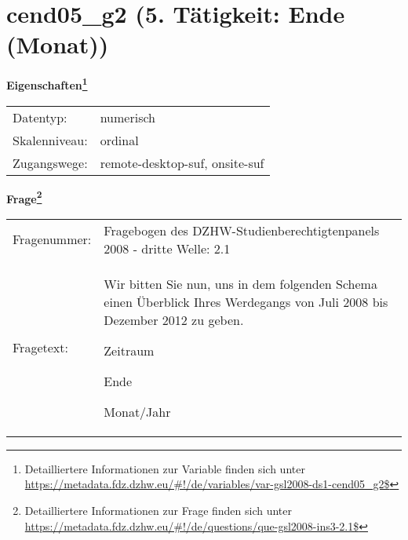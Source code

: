 
    \setcounter{footnote}{0}

    \vspace*{-1.8cm}
	\section{cend05\_g2 (5. Tätigkeit: Ende (Monat))}
	\label{section:cend05_g2}



    \vspace*{0.5cm}
    \noindent\textbf{Eigenschaften\footnote{Detailliertere Informationen zur Variable finden sich unter
		\url{https://metadata.fdz.dzhw.eu/\#!/de/variables/var-gsl2008-ds1-cend05_g2$}}}\\
	\begin{tabularx}{\hsize}{@{}lX}
	Datentyp: & numerisch \\
	Skalenniveau: & ordinal \\
	Zugangswege: &
	  remote-desktop-suf, 
	  onsite-suf
 \\
    \end{tabularx}



				\vspace*{0.5cm}
                \noindent\textbf{Frage\footnote{Detailliertere Informationen zur Frage finden sich unter
		              \url{https://metadata.fdz.dzhw.eu/\#!/de/questions/que-gsl2008-ins3-2.1$}}}\\
				\begin{tabularx}{\hsize}{@{}lX}
					Fragenummer: &
					  Fragebogen des DZHW-Studienberechtigtenpanels 2008 - dritte Welle:
					  2.1
 \\
					Fragetext: & Wir bitten Sie nun, uns in dem folgenden Schema einen Überblick Ihres Werdegangs von Juli 2008 bis Dezember 2012 zu geben.\par  Zeitraum\par  Ende\par  Monat/Jahr \\
				\end{tabularx}





